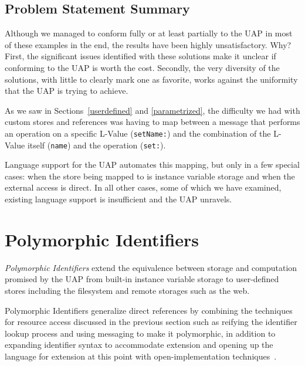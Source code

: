 \documentclass[preprint]{sigplanconf}
\begin{document}
\subsection{Problem Statement Summary}

Although we  managed to conform fully or at least partially to the UAP in most
of these examples in the end, the results have been highly unsatisfactory.  Why?   
First, the significant issues identified with these solutions make it unclear if
conforming to the UAP is worth the cost.  Secondly, the very diversity of the
solutions, with little to clearly mark one as favorite, works against the 
uniformity that the UAP is trying to achieve.

As we saw in Sections~\ref{userdefined} and \ref{parametrized}, the difficulty
we had with custom stores and references was having to map between 
a message that performs an operation on a specific L-Value ({\tt setName:})
and the combination of the  L-Value itself ({\tt name}) and the operation ({\tt set:}).

Language support for the UAP automates this mapping, but only in a few
special cases:  when the store being mapped to is instance variable storage
and when the external access is direct.  In all other cases, some of which
we have examined, existing language support is insufficient and the
UAP unravels.



\section{Polymorphic Identifiers}
\label{polymorphic-identifiers}

\emph{Polymorphic Identifiers} extend the equivalence between storage and 
computation promised by the UAP from built-in instance variable storage
to user-defined stores including the filesystem and remote storages such
as the web.




Polymorphic Identifiers generalize direct references by combining the techniques for resource access
discussed in the previous section such as reifying the identifier lookup process and using messaging 
to make it polymorphic, in addition to expanding identifier syntax to accommodate extension and 
opening up the language for extension at this point  with open-implementation techniques~\cite{OpenImplementations}.
\end{document}
